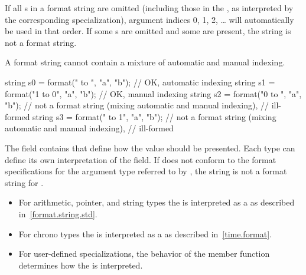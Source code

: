 \pnum
If all s in a format string are omitted
(including those in the ,
as interpreted by the corresponding  specialization),
argument indices 0, 1, 2, \ldots{} will automatically be used in that order.
If some s are omitted and some are present,
the string is not a format string.
\begin{note}
A format string cannot contain a
mixture of automatic and manual indexing.
\end{note}
\begin{example}
\begin{codeblock}
string s0 = format("{} to {}",   "a", "b"); // OK, automatic indexing
string s1 = format("{1} to {0}", "a", "b"); // OK, manual indexing
string s2 = format("{0} to {}",  "a", "b"); // not a format string (mixing automatic and manual indexing),
                                            // ill-formed
string s3 = format("{} to {1}",  "a", "b"); // not a format string (mixing automatic and manual indexing),
                                            // ill-formed
\end{codeblock}
\end{example}

\pnum
The  field contains
that define how the value should be presented.
Each type can define its own
interpretation of the  field.
If  does not conform
to the format specifications for
the argument type referred to by ,
the string is not a format string for .
\begin{example}
\begin{itemize}
\item
For arithmetic, pointer, and string types
the 
is interpreted as a 
as described in~\ref{format.string.std}.
\item
For chrono types
the 
is interpreted as a 
as described in~\ref{time.format}.
\item
For user-defined  specializations,
the behavior of the  member function
determines how the 
is interpreted.
\end{itemize}
\end{example}

